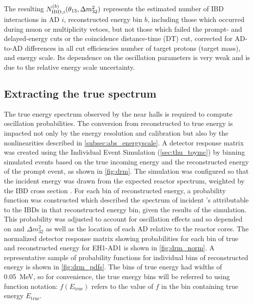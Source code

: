 The resulting $N_{\text{IBD},i}^{(b)}(\theta_{13}, \Delta m^2_{32})$ represents
the estimated number of IBD interactions in AD $i$,
reconstructed energy bin $b$,
including those which occurred during muon or multiplicity vetoes,
but not those which failed the prompt- and delayed-energy cuts
or the coincidence distance-time (DT) cut,
corrected for AD-to-AD differences in all cut efficiencies
number of target protons (target mass),
and energy scale.
Its dependence on the oscillation parameters
is very weak and is due to the relative energy scale uncertainty.


\subsection{Extracting the true \texorpdfstring{\nuebar{}}{antineutrino} spectrum}
\label{subsec:reco_to_true_energy}

The true \nuebar{} energy spectrum observed by the near halls
is required to compute oscillation probabilities.
The conversion from reconstructed to true energy
is impacted not only by the energy resolution and calibration
but also by the nonlinearities described in \cref{subsec:abs_energyscale}.
A detector response matrix was created
using the Individual Event Simulation (\cref{sec:thu_toymc})
by binning simulated events based on the true incoming \nuebar{} energy
and the reconstructed energy of the prompt event,
as shown in \cref{fig:drm}.
The simulation was configured so that the incident \nuebar{} energy
was drawn from the expected reactor \nuebar{} spectrum,
weighted by the IBD cross section \cite{ibd_xsec,ibd_xsec_note}.
For each bin of reconstructed energy,
a probability function was constructed
which described the spectrum of incident \nuebar{}'s
attributable to the IBDs in that reconstructed energy bin,
given the results of the simulation.
This probability was adjusted to account for
oscillation effects and so depended on \thetaot{} and $\Delta m^2_{32}${}
as well as the location of each AD relative to the reactor cores.
The normalized detector response matrix
showing probabilities for each bin of true and reconstructed energy for EH1-AD1
is shown in \cref{fig:drm_norm}.
A representative sample of probability functions
for individual bins of reconstructed energy
is shown in \cref{fig:drm_pdfs}.
The bins of true \nuebar{} energy had widths of \SI{0.05}{\MeV},
so for convenience, the true energy bins will be referred to
using function notation: $f(E_\text{true})$
refers to the value of $f$ in the bin containing true energy $E_\text{true}$.

